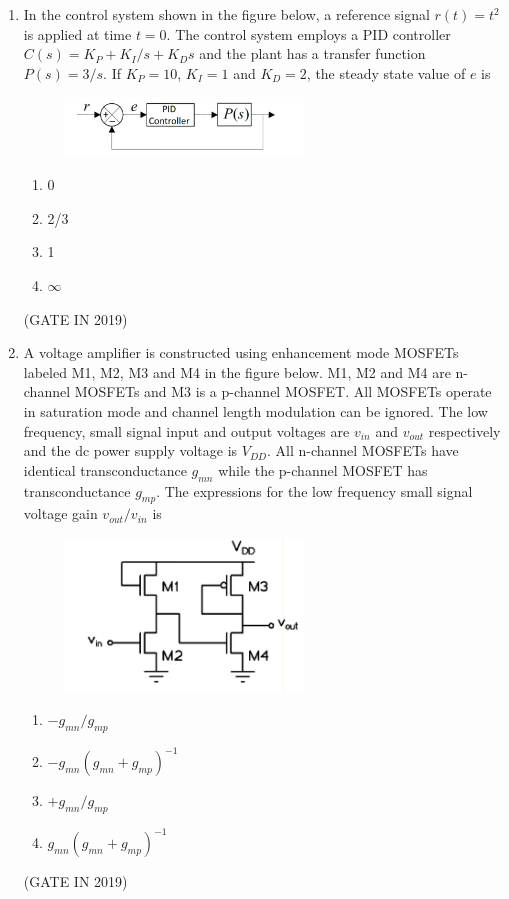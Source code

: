 \documentclass[journal]{IEEEtran}
\begin{document}
\begin{enumerate}
\item In the control system shown in the figure below, a reference signal $r(t) = t^2$ is applied at time $t = 0$. The control system employs a PID controller $C(s) = K_P + K_I / s + K_D s$ and the plant has a transfer function $P(s) = 3 / s$. If $K_P = 10$, $K_I = 1$ and $K_D = 2$, the steady state value of $e$ is
\begin{figure}[H]
    \centering
    \includegraphics[width=0.6\textwidth]{11.png}
    \caption{}
    \label{fig:fig11}
\end{figure}
\begin{multicols}{4}
\begin{enumerate}
\item 0
\item 2/3
\item 1
\item $\infty$
\end{enumerate}
\end{multicols} \hfill(GATE IN 2019)

\item A voltage amplifier is constructed using enhancement mode MOSFETs labeled M1, M2, M3 and M4 in the figure below. M1, M2 and M4 are n-channel MOSFETs and M3 is a p-channel MOSFET. All MOSFETs operate in saturation mode and channel length modulation can be ignored. The low frequency, small signal input and output voltages are $v_{in}$ and $v_{out}$ respectively and the dc power supply voltage is $V_{DD}$. All n-channel MOSFETs have identical transconductance $g_{mn}$ while the p-channel MOSFET has transconductance $g_{mp}$. The expressions for the low frequency small signal voltage gain $v_{out}/v_{in}$ is
\begin{figure}[H]
    \centering
    \includegraphics[width=0.6\textwidth]{12.png}
    \caption{}
    \label{fig:fig12}
\end{figure}
\begin{enumerate}
\item $-g_{mn}/g_{mp}$
\item $-g_{mn}(g_{mn} + g_{mp})^{-1}$
\item $+g_{mn}/g_{mp}$
\item $g_{mn}(g_{mn} + g_{mp})^{-1}$
\end{enumerate}
 \hfill(GATE IN 2019)


\end{enumerate}
\end{document}
